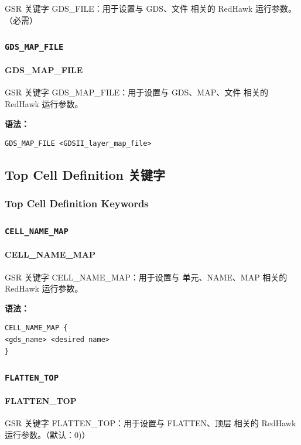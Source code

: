 GSR 关键字 GDS_FILE：用于设置与 GDS、文件 相关的 RedHawk 运行参数。（必需）

\subsubsection{\texttt{GDS_MAP_FILE}}
\paragraph*{GDS_MAP_FILE}

GSR 关键字 GDS_MAP_FILE：用于设置与 GDS、MAP、文件 相关的 RedHawk 运行参数。

\textbf{语法：}
\begin{lstlisting}
GDS_MAP_FILE <GDSII_layer_map_file>
\end{lstlisting}

\subsection{Top Cell Definition 关键字}
\subsubsection*{Top Cell Definition Keywords}

\subsubsection{\texttt{CELL_NAME_MAP}}
\paragraph*{CELL_NAME_MAP}

GSR 关键字 CELL_NAME_MAP：用于设置与 单元、NAME、MAP 相关的 RedHawk 运行参数。

\textbf{语法：}
\begin{lstlisting}
CELL_NAME_MAP {
<gds_name> <desired name>
}
\end{lstlisting}

\subsubsection{\texttt{FLATTEN_TOP}}
\paragraph*{FLATTEN_TOP}

GSR 关键字 FLATTEN_TOP：用于设置与 FLATTEN、顶层 相关的 RedHawk 运行参数。（默认：0)）

